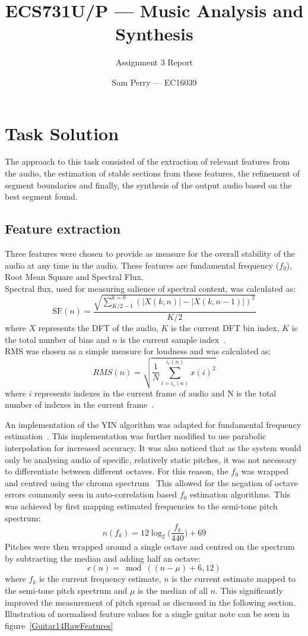 \documentclass[titlepage]{scrartcl}
\begin{document}
\title{ECS731U/P --- Music Analysis and Synthesis}
\subtitle{\LARGE{Assignment 3 Report}}
\author{Sam Perry --- EC16039}

\maketitle

\section{Task Solution}
The approach to this task consisted of the extraction of relevant features from
the audio, the estimation of stable sections from these features, the
refinement of segment boundaries and finally, the synthesis of the output audio
based on the best segment found.

\subsection{Feature extraction}
Three features were chosen to provide as measure for the overall stability of
the audio at any time in the audio. These features are fundamental frequency
($f_0$), Root Mean Square and Spectral Flux.\\
Spectral flux, used for measuring salience of spectral content, was calculated as:
$$
\text{SF}(n) =
\frac{\sqrt{\sum_{K/2-1}^{k=0}(|X(k,n)|-|X(k,n-1)|)^2}}{K/2}
$$
where $X$ represents the DFT of the audio, $K$ is the current DFT bin index, $K$ is
the total number of bins and $n$ is the current sample
index~\parencite{Lerch2012}.\\
RMS was chosen as a simple measure for loudness and was calculated as:
$$RMS(n) = \sqrt{\frac{1}{N}\sum_{i=i_s(n)}^{i_e(n)}{x(i)^2}}$$
where $i$ represents indexes in the current frame of audio and N is the total
number of indexes in the current frame~\parencite{Lerch2012}.

An implementation of the YIN algorithm was adapted for fundamental frequency
estimation~\parencite[p352-353]{Zolzer2011}. This implementation was further
modified to use parabolic interpolation for increased accuracy.
It was also noticed that as the system would only be analysing audio of
specific, relatively static pitches, it was not necessary to differentiate
between different octaves. For this reason, the $f_0$ was wrapped and centred
using the chroma spectrum~\parencite[p.4]{Peeters2006} This allowed for the negation of octave errors
commonly seen in auto-correlation based $f_0$ estimation algorithms. This was
achieved by first mapping estimated frequencies to the semi-tone pitch
spectrum:
$$n(f_k) = 12\log_2\Big(\frac{f_k}{440}\Big)+69$$
Pitches were then wrapped around a single octave and centred on the spectrum by
subtracting the median and adding half an octave:
$$c(n) = \bmod((n-\mu)+6, 12)$$
where $f_k$ is the current frequency estimate, $n$ is the current estimate
mapped to the semi-tone pitch spectrum and $\mu$ is the median of all $n$.
This significantly improved the measurement of pitch spread  as discussed in
the following section.
Illustration of normalised feature values for a single guitar note can be seen
in figure~\ref{Guitar14RawFeatures}
\end{document}
